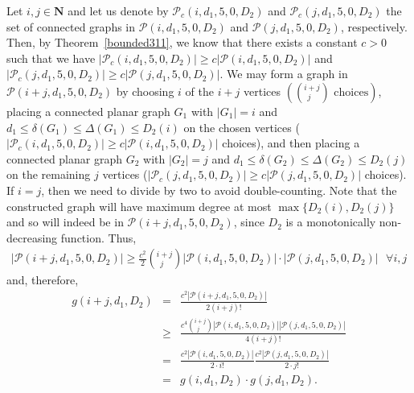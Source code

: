 \documentclass{article}
\newtheorem{Proof of Theorem}{Proof of Theorem}
\begin{document}
Let $i,j \in \mathbf{N}$ and
let us denote by 
$\mathcal{P}_{c}(i,d_{1},5,0,D_{2})$ and $\mathcal{P}_{c}(j,d_{1},5,0,D_{2})$
the set of connected graphs in $\mathcal{P}(i,d_{1},5,0,D_{2})$ and $\mathcal{P}(j,d_{1},5,0,D_{2})$,
respectively.
Then, by Theorem~\ref{bounded311},
we know that there exists a constant $c>0$ such that we have
$|\mathcal{P}_{c}(i,d_{1},5,0,D_{2})| \geq c |\mathcal{P}(i,d_{1},5,0,D_{2})|$
and 
$|\mathcal{P}_{c}(j,d_{1},5,0,D_{2})| \geq c |\mathcal{P}(j,d_{1},5,0,D_{2})|$.
We may form a graph in $\mathcal{P}(i+j,d_{1},5,0,D_{2})$ by choosing $i$ of the $i+j$ vertices 
$\left( \left(^{i+j}_{\phantom{q}j} \right) \textrm{ choices} \right)$,
placing a connected planar graph $G_{1}$ with $|G_{1}|=i$ and $d_{1} \leq \delta(G_{1}) \leq \Delta(G_{1}) \leq D_{2}(i)$
on the chosen vertices
($|\mathcal{P}_{c}(i,d_{1},5,0,D_{2})| \geq c |\mathcal{P}(i,d_{1},5,0,D_{2})|$ choices),
and then placing a connected planar graph $G_{2}$ with $|G_{2}|=j$ and 
$d_{1} \leq \delta(G_{2}) \leq \Delta(G_{2}) \leq D_{2}(j)$
on the remaining $j$ vertices
($|\mathcal{P}_{c}(j,d_{1},5,0,D_{2})| \geq c|\mathcal{P}(j,d_{1},5,0,D_{2})|$ choices).
If $i=j$,
then we need to divide by two to avoid double-counting.
Note that the constructed graph will have maximum degree at most $\max \{ D_{2}(i), D_{2}(j) \}$
and so will indeed be in $\mathcal{P}(i+j,d_{1},5,0,D_{2})$,
since $D_{2}$ is a monotonically non-decreasing function.
Thus,
\begin{eqnarray*}
|\mathcal{P}(i+j,d_{1},5,0,D_{2})| \geq 
\frac{c^{2}}{2} \left(^{i+j}_{\phantom{q}j} \right) 
|\mathcal{P}(i,d_{1},5,0,D_{2})| \cdot |\mathcal{P}(j,d_{1},5,0,D_{2})| \textrm{ } \forall i,j
\end{eqnarray*}
and, therefore,
\begin{eqnarray*}
g(i+j,d_{1},D_{2}) & = & \frac{c^{2} |\mathcal{P}(i+j,d_{1},5,0,D_{2})|}{2(i+j)!} \\
& \geq & \frac{ c^{4} \left(^{i+j}_{\phantom{q}j} \right) 
|\mathcal{P}(i,d_{1},5,0,D_{2})| |\mathcal{P}(j,d_{1},5,0,D_{2})|}
{4(i+j)!} \\
& = & \frac{ c^{2} |\mathcal{P}(i,d_{1},5,0,D_{2})|}{2 \cdot i!} 
\frac{c^{2} |\mathcal{P}(j,d_{1},5,0,D_{2})|}{2 \cdot j!} \\
& = & g(i,d_{1},D_{2}) \cdot g(j,d_{1},D_{2}). \\
\end{eqnarray*} 
\end{document}
